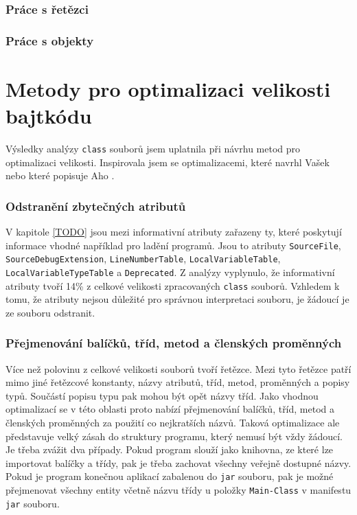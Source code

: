 \subsubsection{Práce s řetězci}


\subsubsection{Práce s objekty}

\section{Metody pro optimalizaci velikosti bajtkódu}\label{Analysis}

Výsledky analýzy \texttt{class} souborů jsem uplatnila při návrhu metod pro optimalizaci velikosti. Inspirovala jsem se optimalizacemi, které navrhl Vašek \cite{TODO} nebo které popisuje Aho \cite{TODO}.

\subsubsection{Odstranění zbytečných atributů}
V kapitole \ref{TODO} jsou mezi informativní atributy zařazeny ty, které poskytují informace vhodné například pro ladění programů. Jsou to atributy \texttt{SourceFile}, \texttt{SourceDebugExtension}, \texttt{LineNumberTable}, \texttt{LocalVariableTable}, \texttt{LocalVariableTypeTable} a \texttt{Deprecated}.  Z analýzy vyplynulo, že informativní atributy tvoří 14\% z celkové velikosti zpracovaných \texttt{class} souborů. Vzhledem k tomu, že atributy nejsou důležité pro správnou interpretaci souboru, je žádoucí je ze souboru odstranit.

\subsubsection{Přejmenování balíčků, tříd, metod a členských proměnných}
Více než polovinu z celkové velikosti souborů tvoří řetězce. Mezi tyto řetězce patří mimo jiné řetězcové konstanty, názvy atributů, tříd, metod, proměnných a popisy typů. Součástí popisu typu pak mohou být opět názvy tříd. Jako vhodnou optimalizací se v této oblasti proto nabízí přejmenování balíčků, tříd, metod a členských proměnných za použití co nejkratších názvů. Taková optimalizace ale představuje velký zásah do struktury programu, který nemusí být vždy žádoucí. Je třeba zvážit dva případy. Pokud program slouží jako knihovna, ze které lze importovat balíčky a třídy, pak je třeba zachovat všechny veřejně dostupné názvy. Pokud je program konečnou aplikací zabalenou do \texttt{jar} souboru, pak je možné přejmenovat všechny entity včetně názvu třídy u položky \texttt{Main-Class} v manifestu \texttt{jar} souboru.

